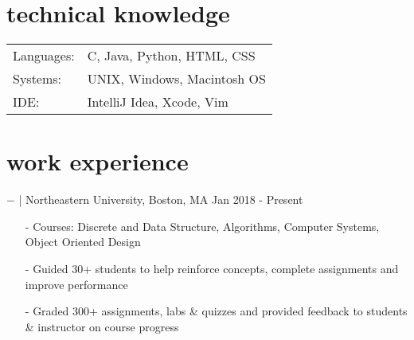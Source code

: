 \documentclass[a4paper, 10pt, oneside]{article}
\newcommand{\bulltetspace}{\vspace{-0.3em}}
\begin{document}
\begin{center}

\vspace{-1.5em}
\section{\color{headings}technical knowledge}
\vspace{-0.5em}
\color{text1}
\raggedright
\begin{tabular}{l l}
Languages: & C, Java, Python, HTML, CSS\\
Systems: & UNIX, Windows, Macintosh OS\\
IDE: & IntelliJ Idea, Xcode, Vim\\
\end{tabular}


\vspace{-0.5em}
\section{\color{headings}work experience}
\vspace{-0.5em}
$-$ \color{headings}{Teaching Assistant} | Northeastern University, Boston, MA \hfill Jan 2018 - Present\\


\begin{itemize} 
\bulltetspace
\item[-] Courses: Discrete and Data Structure, Algorithms, Computer Systems, Object Oriented Design\\
\bulltetspace
\color{text1}
\item[-] Guided 30+ students to help reinforce concepts, complete assignments and improve performance\\
\bulltetspace
\item[-] Graded 300+ assignments, labs \& quizzes and provided feedback to students \& instructor on course progress
\end{itemize}


\end{center}
\end{document}
